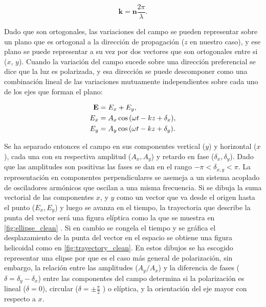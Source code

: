 $$\mathbf{k} = \mathbf{n} \frac{2\pi}{\lambda}.$$

Dado que son ortogonales, las variaciones del campo se pueden
representar sobre un plano que es 
ortogonal a la dirección de propagación ($z$ en nuestro caso), y ese plano se puede
representar a su vez por dos vectores que son ortogonales entre si
($x$, $y$).
Cuando la variación del campo sucede sobre una dirección preferencial
se dice que la luz es polarizada, y esa dirección se puede descomponer
como una combinación lineal de las variaciones mutuamente independientes
sobre cada uno de los ejes que forman el plano:

\begin{align}
\mathbf{E} &= E_x +E_y, \notag\\
E_x &= A_x\cos{ \left(\omega t -kz+\delta_x\right)} \label{eq:xcomp},\\
E_y &= A_y\cos{ \left(\omega t -kz+\delta_y\right)}\label{eq:ycomp}.
\end{align}

Se ha separado entonces el campo en sus componentes vertical ($y$) y
horizontal ($x$), cada una con su respectiva amplitud ($A_x,A_y$) y
retardo en fase ($\delta_x,\delta_y$). Dado que las amplitudes son
positivas las fases se dan en el rango $-\pi<\delta_{x,y}<\pi$.
La representación en componentes perpendiculares se asemeja a un
sistema acoplado de osciladores armónicos que oscilan a una misma
frecuencia. Si se dibuja la suma vectorial de las componentes $x$, y $y$ como
un vector que va desde el origen hasta el punto ($E_x,E_y$) y luego se
avanza en el tiempo, la trayectoria que describe la punta del vector
será una figura elíptica como la que 
se muestra en \ref{fig:ellipse_clean} . Si en cambio se congela el tiempo y se gráfica
el desplazamiento de la punta del vector en el espacio se obtiene una figura
helicoidal como en \ref{fig:trayectory_clean}. En estos dibujos se ha
escogido representar una elipse por que es el caso más general de polarización, sin
embargo, la relación entre las amplitudes ($A_y/A_x$) y la
diferencia de fases ($\delta = \delta_y-\delta_x$) entre las componentes del
campo determina si la polarización es lineal ($\delta = 0$), circular
($\delta =\pm \frac{\pi}{2}$ ) o elíptica, y la orientación del eje
mayor con respecto a $x$.

